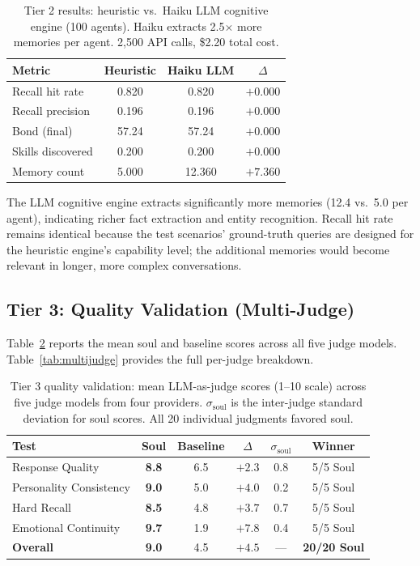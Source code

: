 \documentclass{article}
\begin{document}
\begin{table}[h]
\centering
\small
\begin{tabular}{@{}lccc@{}}
\toprule
\textbf{Metric} & \textbf{Heuristic} & \textbf{Haiku LLM} & \textbf{$\Delta$} \\
\midrule
Recall hit rate   & 0.820 & 0.820 & $+0.000$ \\
Recall precision  & 0.196 & 0.196 & $+0.000$ \\
Bond (final)      & 57.24 & 57.24 & $+0.000$ \\
Skills discovered & 0.200 & 0.200 & $+0.000$ \\
Memory count      & 5.000 & 12.360 & $\mathbf{+7.360}$ \\
\bottomrule
\end{tabular}
\caption{Tier 2 results: heuristic vs.\ Haiku LLM cognitive engine (100 agents). Haiku extracts 2.5$\times$ more memories per agent. 2,500 API calls, \$2.20 total cost.}
\label{tab:tier2}
\end{table}

The LLM cognitive engine extracts significantly more memories (12.4 vs.\ 5.0 per agent), indicating richer fact extraction and entity recognition. Recall hit rate remains identical because the test scenarios' ground-truth queries are designed for the heuristic engine's capability level; the additional memories would become relevant in longer, more complex conversations.

\subsection{Tier 3: Quality Validation (Multi-Judge)}

Table~\ref{tab:tier3} reports the mean soul and baseline scores across all five judge models. Table~\ref{tab:multijudge} provides the full per-judge breakdown.

\begin{table}[h]
\centering
\begin{tabular}{@{}lccccc@{}}
\toprule
\textbf{Test} & \textbf{Soul} & \textbf{Baseline} & \textbf{$\Delta$} & \textbf{$\sigma_\text{soul}$} & \textbf{Winner} \\
\midrule
Response Quality        & \textbf{8.8} & 6.5 & $+2.3$ & 0.8 & 5/5 Soul \\
Personality Consistency & \textbf{9.0} & 5.0 & $+4.0$ & 0.2 & 5/5 Soul \\
Hard Recall             & \textbf{8.5} & 4.8 & $+3.7$ & 0.7 & 5/5 Soul \\
Emotional Continuity    & \textbf{9.7} & 1.9 & $+7.8$ & 0.4 & 5/5 Soul \\
\midrule
\textbf{Overall}        & \textbf{9.0} & 4.5 & $+4.5$ & --- & \textbf{20/20 Soul} \\
\bottomrule
\end{tabular}
\caption{Tier 3 quality validation: mean LLM-as-judge scores (1--10 scale) across five judge models from four providers. $\sigma_\text{soul}$ is the inter-judge standard deviation for soul scores. All 20 individual judgments favored soul.}
\label{tab:tier3}
\end{table}
\end{document}
